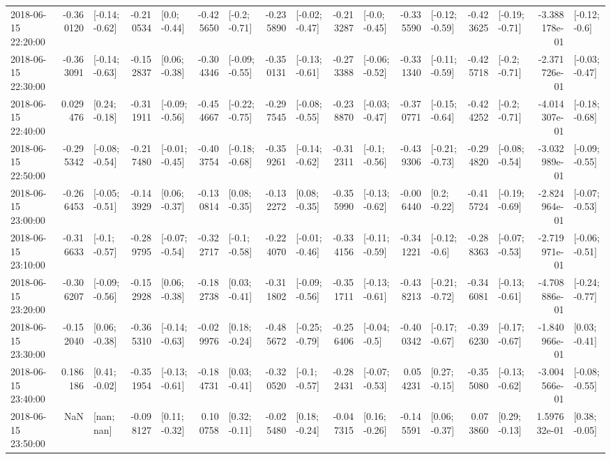 \begin{tabular}{lrlrlrlrlrlrlrlrl}
2018-06-15 22:20:00 & -0.360120 &  [-0.14; -0.62] & -0.210534 &    [0.0; -0.44] & -0.425650 &   [-0.2; -0.71] & -0.235890 &  [-0.02; -0.47] & -0.213287 &   [-0.0; -0.45] & -0.335590 &  [-0.12; -0.59] & -0.423625 &  [-0.19; -0.71] & -3.388178e-01 &   [-0.12; -0.6] \\
2018-06-15 22:30:00 & -0.363091 &  [-0.14; -0.63] & -0.152837 &   [0.06; -0.38] & -0.304346 &  [-0.09; -0.55] & -0.350131 &  [-0.13; -0.61] & -0.273388 &  [-0.06; -0.52] & -0.331340 &  [-0.11; -0.59] & -0.425718 &   [-0.2; -0.71] & -2.371726e-01 &  [-0.03; -0.47] \\
2018-06-15 22:40:00 &  0.029476 &   [0.24; -0.18] & -0.311911 &  [-0.09; -0.56] & -0.454667 &  [-0.22; -0.75] & -0.297545 &  [-0.08; -0.55] & -0.238870 &  [-0.03; -0.47] & -0.370771 &  [-0.15; -0.64] & -0.424252 &   [-0.2; -0.71] & -4.014307e-01 &  [-0.18; -0.68] \\
2018-06-15 22:50:00 & -0.295342 &  [-0.08; -0.54] & -0.217480 &  [-0.01; -0.45] & -0.403754 &  [-0.18; -0.68] & -0.359261 &  [-0.14; -0.62] & -0.312311 &   [-0.1; -0.56] & -0.439306 &  [-0.21; -0.73] & -0.294820 &  [-0.08; -0.54] & -3.032989e-01 &  [-0.09; -0.55] \\
2018-06-15 23:00:00 & -0.266453 &  [-0.05; -0.51] & -0.143929 &   [0.06; -0.37] & -0.130814 &   [0.08; -0.35] & -0.132272 &   [0.08; -0.35] & -0.355990 &  [-0.13; -0.62] & -0.006440 &    [0.2; -0.22] & -0.415724 &  [-0.19; -0.69] & -2.824964e-01 &  [-0.07; -0.53] \\
2018-06-15 23:10:00 & -0.316633 &   [-0.1; -0.57] & -0.289795 &  [-0.07; -0.54] & -0.322717 &   [-0.1; -0.58] & -0.224070 &  [-0.01; -0.46] & -0.334156 &  [-0.11; -0.59] & -0.341221 &   [-0.12; -0.6] & -0.288363 &  [-0.07; -0.53] & -2.719971e-01 &  [-0.06; -0.51] \\
2018-06-15 23:20:00 & -0.306207 &  [-0.09; -0.56] & -0.152928 &   [0.06; -0.38] & -0.182738 &   [0.03; -0.41] & -0.311802 &  [-0.09; -0.56] & -0.351711 &  [-0.13; -0.61] & -0.438213 &  [-0.21; -0.72] & -0.346081 &  [-0.13; -0.61] & -4.708886e-01 &  [-0.24; -0.77] \\
2018-06-15 23:30:00 & -0.152040 &   [0.06; -0.38] & -0.365310 &  [-0.14; -0.63] & -0.029976 &   [0.18; -0.24] & -0.485672 &  [-0.25; -0.79] & -0.256406 &   [-0.04; -0.5] & -0.400342 &  [-0.17; -0.67] & -0.396230 &  [-0.17; -0.67] & -1.840966e-01 &   [0.03; -0.41] \\
2018-06-15 23:40:00 &  0.186186 &   [0.41; -0.02] & -0.351954 &  [-0.13; -0.61] & -0.184731 &   [0.03; -0.41] & -0.320520 &   [-0.1; -0.57] & -0.282431 &  [-0.07; -0.53] &  0.054231 &   [0.27; -0.15] & -0.355080 &  [-0.13; -0.62] & -3.004566e-01 &  [-0.08; -0.55] \\
2018-06-15 23:50:00 &       NaN &      [nan; nan] & -0.098127 &   [0.11; -0.32] &  0.100758 &   [0.32; -0.11] & -0.025480 &   [0.18; -0.24] & -0.047315 &   [0.16; -0.26] & -0.145591 &   [0.06; -0.37] &  0.073860 &   [0.29; -0.13] &  1.597632e-01 &   [0.38; -0.05] \\
\bottomrule
\end{tabular}

